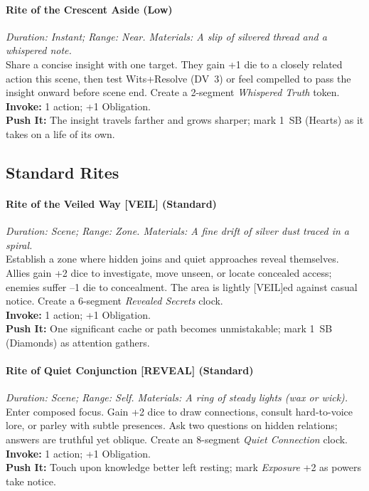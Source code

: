 \paragraph{Rite of the Crescent Aside (Low)}%
\emph{Duration: Instant; Range: Near. Materials: A slip of silvered thread and a whispered note.}\\
Share a concise insight with one target. They gain +1 die to a closely related action this scene, then test Wits+Resolve (DV~3) or feel compelled to pass the insight onward before scene end. Create a 2-segment \emph{Whispered Truth} token.\\
\textbf{Invoke:} 1 action; +1 Obligation.\\
\textbf{Push It:} The insight travels farther and grows sharper; mark 1~SB (Hearts) as it takes on a life of its own.

\subsection*{Standard Rites}

\paragraph{Rite of the Veiled Way [VEIL] (Standard)}%
\emph{Duration: Scene; Range: Zone. Materials: A fine drift of silver dust traced in a spiral.}\\
Establish a zone where hidden joins and quiet approaches reveal themselves. Allies gain +2 dice to investigate, move unseen, or locate concealed access; enemies suffer --1 die to concealment. The area is lightly [VEIL]ed against casual notice. Create a 6-segment \emph{Revealed Secrets} clock.\\
\textbf{Invoke:} 1 action; +1 Obligation.\\
\textbf{Push It:} One significant cache or path becomes unmistakable; mark 1~SB (Diamonds) as attention gathers.

\paragraph{Rite of Quiet Conjunction [REVEAL] (Standard)}%
\emph{Duration: Scene; Range: Self. Materials: A ring of steady lights (wax or wick).}\\
Enter composed focus. Gain +2 dice to draw connections, consult hard-to-voice lore, or parley with subtle presences. Ask two questions on hidden relations; answers are truthful yet oblique. Create an 8-segment \emph{Quiet Connection} clock.\\
\textbf{Invoke:} 1 action; +1 Obligation.\\
\textbf{Push It:} Touch upon knowledge better left resting; mark \emph{Exposure} +2 as powers take notice.

